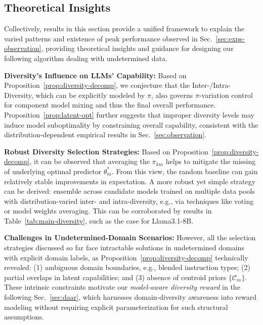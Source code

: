 \subsection{Theoretical Insights}
\label{sec:theory-insights}

Collectively, results in this section provide a unified framework to explain the varied patterns and existence of peak performance observed in Sec.~\ref{sec:exps-observation}, providing theoretical insights and guidance for designing our following algorithm dealing with undetermined data.

\textbf{Diversity's Influence on LLMs' Capability:} Based on Proposition~\ref{prop:diversity-decomp}, we conjecture that the Inter-/Intra-Diversity, which can be explicitly modeled by $\pi$, also governs $\pi$-variation control for component model mixing and thus the final overall performance. Proposition~\ref{prop:latent-opt} further suggests that improper diversity levels may induce model suboptimality by constraining overall capability, consistent with the distribution-dependent empirical results in Sec.~\ref{sec:observation}.

\textbf{Robust Diversity Selection Strategies:} Based on Proposition~\ref{prop:diversity-decomp}, it can be observed that averaging the \(\pi_{km}\) helps to mitigate the missing of underlying optimal predictor \(\theta_m^*\). From this view, the random baseline can gain relatively stable improvements in expectation. A more robust yet simple strategy can be derived: ensemble across candidate models trained on multiple data pools with distribution-varied inter- and intra-diversity, e.g., via techniques like voting or model weights averaging.
This can be corroborated by results in Table~\ref{tab:main-diversity}, such as the case for Llama3.1-8B.

\textbf{Challenges in Undetermined-Domain Scenarios:} 
However, all the selection strategies discussed so far face intractable solutions in undetermined domains with explicit domain labels, as Proposition~\ref{prop:diversity-decomp} technically revealed: (1) ambiguous domain boundaries, e.g., blended instruction types; (2) partial overlaps in latent capabilities; and (3) absence of centroid priors $\{\mathcal{C}_m\}$. 
These intrinsic constraints motivate our \textit{model-aware diversity reward} in the following Sec.~\ref{sec:daar}, which harnesses domain-diversity awareness into reward modeling without requiring explicit parameterization for such structural assumptions.

